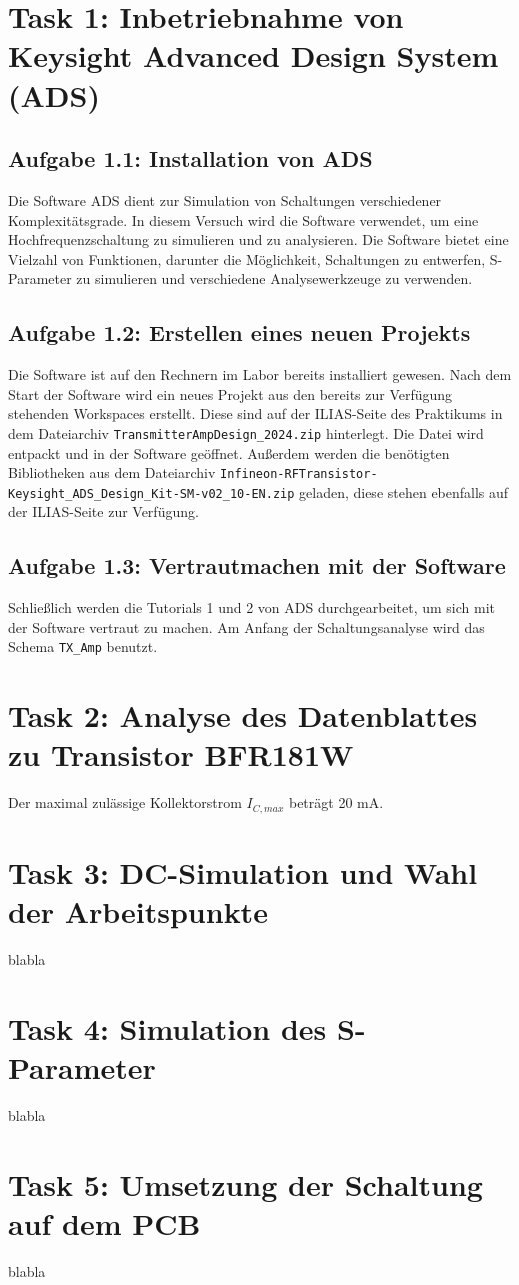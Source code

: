 
\section{Task 1: Inbetriebnahme von Keysight Advanced Design System (ADS)}
\subsection{Aufgabe 1.1: Installation von ADS}
Die Software \ac{ADS} dient zur Simulation von Schaltungen verschiedener Komplexitätsgrade. 
In diesem Versuch wird die Software verwendet, um eine Hochfrequenzschaltung zu simulieren und zu analysieren. 
Die Software bietet eine Vielzahl von Funktionen, darunter die Möglichkeit, Schaltungen zu entwerfen, 
S-Parameter zu simulieren und verschiedene Analysewerkzeuge zu verwenden.

\subsection{Aufgabe 1.2: Erstellen eines neuen Projekts}
Die Software ist auf den Rechnern im Labor bereits installiert gewesen. Nach dem Start der Software wird ein neues Projekt aus den
bereits zur Verfügung stehenden Workspaces erstellt. Diese sind auf der ILIAS-Seite des Praktikums in dem Dateiarchiv \texttt{TransmitterAmpDesign\_2024.zip} hinterlegt.
Die Datei wird entpackt und in der Software geöffnet. Außerdem werden die benötigten Bibliotheken aus dem Dateiarchiv \texttt{Infineon-RFTransistor-Keysight\_\ac{ADS}\_Design\_Kit-SM-v02\_10-EN.zip} geladen, 
diese stehen ebenfalls auf der ILIAS-Seite zur Verfügung.
\subsection{Aufgabe 1.3: Vertrautmachen mit der Software}
Schließlich werden die Tutorials 1 und 2 von \ac{ADS} durchgearbeitet, um sich mit der Software vertraut zu machen. 
Am Anfang der Schaltungsanalyse wird das Schema \texttt{TX\_Amp} benutzt.

\section{Task 2: Analyse des Datenblattes zu Transistor BFR181W}
Der maximal zulässige Kollektorstrom $I_{C,max}$ beträgt 20 mA. 
\section{Task 3: DC-Simulation und Wahl der Arbeitspunkte}
blabla
\section{Task 4: Simulation des S-Parameter}
blabla
\section{Task 5: Umsetzung der Schaltung auf dem PCB}
blabla
\clearpage